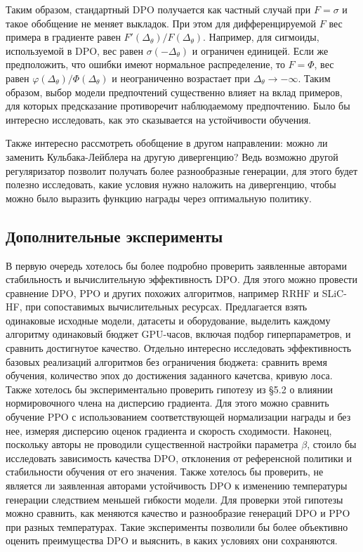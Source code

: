 \documentclass[11pt,a4paper]{article}
\theoremstyle{remark}
\begin{document}
Таким образом, стандартный DPO получается как частный случай при \(F=\sigma\) и такое обобщение не меняет выкладок. При этом для дифференцируемой \(F\) вес примера в градиенте равен \(F'(\Delta_\theta)/F(\Delta_\theta)\). Например, для сигмоиды, используемой в DPO, вес равен $\sigma(-\Delta_\theta)$ и ограничен единицей. Если же предположить, что ошибки имеют нормальное распределение, то $F=\Phi$, вес равен $\varphi(\Delta_\theta)/\Phi(\Delta_\theta)$ и неограниченно возрастает при $\Delta_\theta\to-\infty$. Таким образом, выбор модели предпочтений существенно влияет на вклад примеров, для которых предсказание противоречит наблюдаемому предпочтению. Было бы интересно исследовать, как это сказывается на устойчивости обучения.

Также интересно рассмотреть обобщение в другом направлении: можно ли заменить Кульбака-Лейблера на другую дивергенцию? Ведь возможно другой регуляризатор позволит получать более разнообразные генерации, для этого будет полезно исследовать, какие условия нужно наложить на дивергенцию, чтобы можно было выразить функцию награды через оптимальную политику.

\subsection{Дополнительные эксперименты}

В первую очередь хотелось бы более подробно проверить заявленные авторами стабильность и вычислительную эффективность DPO. Для этого можно провести сравнение DPO, PPO и других похожих алгоритмов, например RRHF и SLiC-HF, при сопоставимых вычислительных ресурсах. Предлагается взять одинаковые исходные модели, датасеты и оборудование, выделить каждому алгоритму одинаковый бюджет GPU-часов, включая подбор гиперпараметров, и сравнить достигнутое качество. Отдельно интересно исследовать эффективность базовых реализаций алгоритмов без ограничения бюджета: сравнить время обучения, количество эпох до достижения заданного качетсва, кривую лоса. Также хотелось бы экспериментально проверить гипотезу из \S 5.2 о влиянии нормировочного члена на дисперсию градиента. Для этого можно сравнить обучение PPO с использованием соответствующей нормализации награды и без нее, измеряя дисперсию оценок градиента и скорость сходимости. Наконец, поскольку авторы не проводили существенной настройки параметра $\beta$, стоило бы исследовать зависимость качества DPO, отклонения от референсной политики и стабильности обучения от его значения. Также хотелось бы проверить, не является ли заявленная авторами устойчивость DPO к изменению температуры генерации следствием меньшей гибкости модели. Для проверки этой гипотезы можно сравнить, как меняются качество и разнообразие генераций DPO и PPO при разных температурах. Такие эксперименты позволили бы более объективно оценить преимущества DPO и выяснить, в каких условиях они сохраняются.
\end{document}
